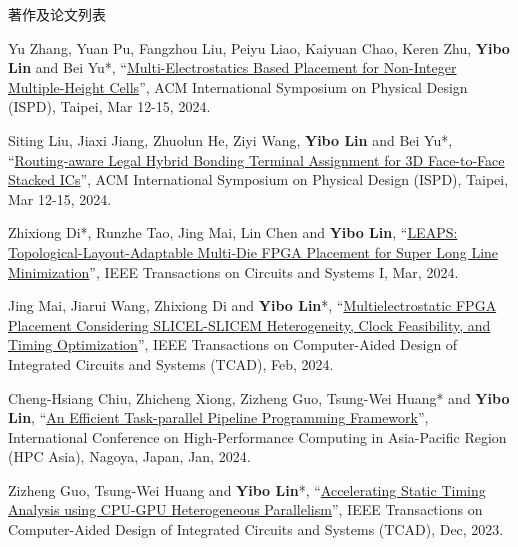 \begin{rSection}{著作及论文列表}
\begin{description}[font=\normalfont, rightmargin=2em]
\item[{[C139]}]{
        Yu Zhang, Yuan Pu, Fangzhou Liu, Peiyu Liao, Kaiyuan Chao, Keren Zhu, \textbf{Yibo Lin} and Bei Yu*, 
    ``\href{https://doi.org/10.1145/3626184.3633320}{Multi-Electrostatics Based Placement for Non-Integer Multiple-Height Cells}'', 
    ACM International Symposium on Physical Design (ISPD), Taipei, Mar 12-15, 2024.
    
}
            

\item[{[C138]}]{
        Siting Liu, Jiaxi Jiang, Zhuolun He, Ziyi Wang, \textbf{Yibo Lin} and Bei Yu*, 
    ``\href{https://doi.org/10.1145/3626184.3633322}{Routing-aware Legal Hybrid Bonding Terminal Assignment for 3D Face-to-Face Stacked ICs}'', 
    ACM International Symposium on Physical Design (ISPD), Taipei, Mar 12-15, 2024.
    
}
            

\item[{[J137]}]{
        Zhixiong Di*, Runzhe Tao, Jing Mai, Lin Chen and \textbf{Yibo Lin}, 
    ``\href{https://doi.org/10.1109/TCSI.2023.3340554}{LEAPS: Topological-Layout-Adaptable Multi-Die FPGA Placement for Super Long Line Minimization}'', 
    IEEE Transactions on Circuits and Systems I, Mar, 2024.
    
}
            

\item[{[J136]}]{
        Jing Mai, Jiarui Wang, Zhixiong Di and \textbf{Yibo Lin}*, 
    ``\href{https://doi.org/10.1109/TCAD.2023.3313101}{Multielectrostatic FPGA Placement Considering SLICEL-SLICEM Heterogeneity, Clock Feasibility, and Timing Optimization}'', 
    IEEE Transactions on Computer-Aided Design of Integrated Circuits and Systems (TCAD), Feb, 2024.
    
}
            

\item[{[C135]}]{
        Cheng-Hsiang Chiu, Zhicheng Xiong, Zizheng Guo, Tsung-Wei Huang* and \textbf{Yibo Lin}, 
    ``\href{https://doi.org/10.1145/3635035.3635037}{An Efficient Task-parallel Pipeline Programming Framework}'', 
    International Conference on High-Performance Computing in Asia-Pacific Region (HPC Asia), Nagoya, Japan, Jan, 2024.
    
}
            

\item[{[J134]}]{
        Zizheng Guo, Tsung-Wei Huang and \textbf{Yibo Lin}*, 
    ``\href{https://doi.org/10.1109/TCAD.2023.3286261}{Accelerating Static Timing Analysis using CPU-GPU Heterogeneous Parallelism}'', 
    IEEE Transactions on Computer-Aided Design of Integrated Circuits and Systems (TCAD), Dec, 2023.
    
}
\end{description}
\end{rSection}
